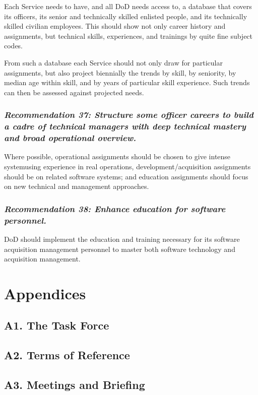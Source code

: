 \documentclass[12pt,final]{article}
\begin{document}
Each Service needs to have, and all DoD needs access to, a database that covers
its officers, its senior and technically skilled enlisted people, and its
technically skilled civilian employees. This should show not only career
history and assignments, but technical skills, experiences, and trainings by
quite fine subject codes.

From such a database each Service should not only draw for particular
assignments, but also project biennially the trends by skill, by seniority, by
median age within skill, and by years of particular skill experience. Such
trends can then be assessed against projected needs.

\subsubsection*{\textit{Recommendation 37: Structure some officer careers to
build a cadre of technical managers with deep technical mastery and broad
operational overview.}}

Where possible, operational assignments should be chosen to give intense
systemusing experience in real operations, development/acquisition assignments
should be on related software systems; and education assignments should focus
on new technical and management approaches.

\subsubsection*{\textit{Recommendation 38: Enhance education for software
personnel.}}

DoD should implement the education and training necessary for its software
acquisition management personnel to master both software technology and
acquisition management.

\newpage
\section{Appendices}

\subsection*{A1. The Task Force}

\subsection*{A2. Terms of Reference}

\subsection*{A3. Meetings and Briefing}
\end{document}
